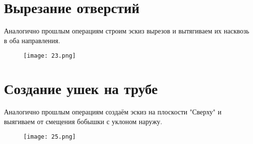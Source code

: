 \section{Вырезание отверстий}
Аналогично прошлым операциям строим эскиз вырезов и вытягиваем их насквозь в оба направления. 
\FloatBarrier
\begin{figure}[ht]
    \centering
    \texttt{[image: 23.png]}
\end{figure}
\FloatBarrier

\section{Создание ушек на трубе}
Аналогично прошлым операциям создаём эскиз на плоскости "Сверху" и выягиваем от смещения бобышки с уклоном наружу. 
\FloatBarrier
\begin{figure}[ht]
    \centering
    \texttt{[image: 25.png]}
\end{figure}
\FloatBarrier

